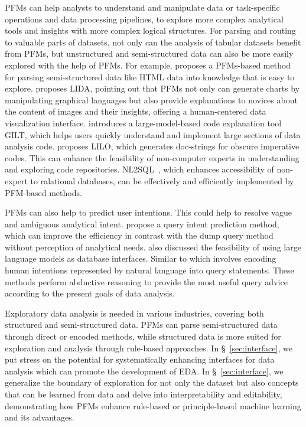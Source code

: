   PFMs can help analysts to understand and manipulate data or task-specific operations and data processing pipelines, to explore more complex analytical tools and insights with more complex logical structures. For parsing and routing to valuable parts of datasets, not only can the analysis of tabular datasets benefit from PFMs, but unstructured and semi-structured data can also be more easily explored with the help of PFMs. For example, \cite{ko2024filling} proposes a PFMs-based method for parsing semi-structured data like HTML data into knowledge that is easy to explore. \cite{Dibia2023LIDAAT} proposes LIDA, pointing out that PFMs not only can generate charts by manipulating graphical languages but also provide explanations to novices about the content of images and their insights, offering a human-centered data visualization interface. \cite{nam2024using} introduces a large-model-based code explanation tool GILT, which helps users quickly understand and implement large sections of data analysis code. \cite{GrandWBOLTA24} proposes LILO, which generates doc-strings for obscure imperative codes. This can enhance the feasibility of non-computer experts in understanding and exploring code repositories. NL2SQL~\cite{smalllargemodelNL2SQL,text2sqlevaluation,readyforNL2SQL}, which enhances accessibility of non-expert to ralational databases, can be effectively and efficiently implemented by PFM-based methods. 
  
  PFMs can also help to predict user intentions. This could help to resolve vague and ambiguous analytical intent. \cite{dubiel2024device} propose a query intent prediction method, which can improve the efficiency in contrast with the dump query method without perception of analytical needs. \cite{li2024can} also discussed the feasibility of using large language models as database interfaces. Similar to which involves encoding human intentions represented by natural language into query statements. These methods perform abductive reasoning to provide the most useful query advice according to the present goals of data analysis.
  
  Exploratory data analysis is needed in various industries, covering both structured and semi-structured data. PFMs can parse semi-structured data through direct or encoded methods, while structured data is more suited for exploration and analysis through rule-based approaches. In \S~\ref{sec:interface}, we put stress on the potential for systematically enhancing interfaces for data analysis which can promote the development of EDA. In \S~\ref{sec:interface}, we generalize the boundary of exploration for not only the dataset but also concepts that can be learned from data and delve into interpretability and editability, demonstrating how PFMs enhance rule-based or principle-based machine learning and its advantages.
  
